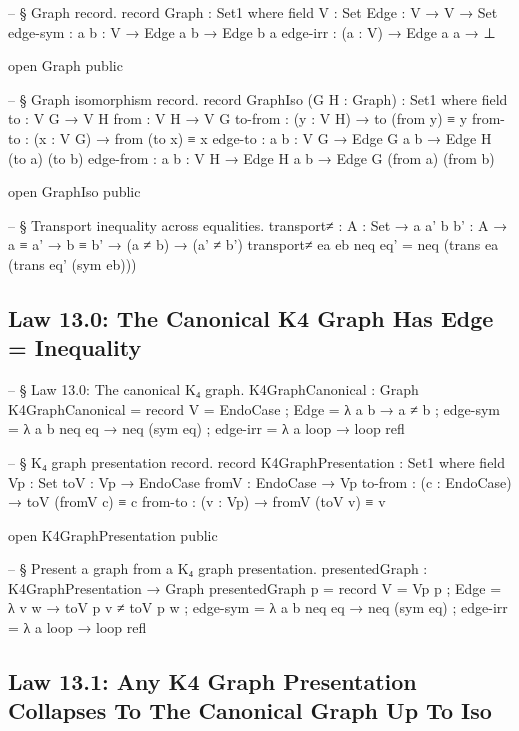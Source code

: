 \documentclass[11pt,a4paper]{book}
\def\texorpdfstring#1#2{#2}%
\begin{document}
\begin{code}
-- § Graph record.
record Graph : Set1 where
  field
    V    : Set
    Edge : V → V → Set
    edge-sym : {a b : V} → Edge a b → Edge b a
    edge-irr : (a : V) → Edge a a → ⊥

open Graph public

-- § Graph isomorphism record.
record GraphIso (G H : Graph) : Set1 where
  field
    to       : V G → V H
    from     : V H → V G
    to-from  : (y : V H) → to (from y) ≡ y
    from-to  : (x : V G) → from (to x) ≡ x
    edge-to  : {a b : V G} → Edge G a b → Edge H (to a) (to b)
    edge-from : {a b : V H} → Edge H a b → Edge G (from a) (from b)

open GraphIso public

-- § Transport inequality across equalities.
transport≠ :
  {A : Set} →
  {a a' b b' : A} →
  a ≡ a' →
  b ≡ b' →
  (a ≠ b) →
  (a' ≠ b')
transport≠ ea eb neq eq' = neq (trans ea (trans eq' (sym eb)))
\end{code}

\subsection{Law 13.0: The Canonical K\texorpdfstring{$_4$}{4} Graph Has Edge = Inequality}

\begin{code}
-- § Law 13.0: The canonical K₄ graph.
K4GraphCanonical : Graph
K4GraphCanonical = record
  { V = EndoCase
  ; Edge = λ a b → a ≠ b
  ; edge-sym = λ {a} {b} neq eq → neq (sym eq)
  ; edge-irr = λ a loop → loop refl
  }

-- § K₄ graph presentation record.
record K4GraphPresentation : Set1 where
  field
    Vp      : Set
    toV     : Vp → EndoCase
    fromV   : EndoCase → Vp
    to-from : (c : EndoCase) → toV (fromV c) ≡ c
    from-to : (v : Vp) → fromV (toV v) ≡ v

open K4GraphPresentation public

-- § Present a graph from a K₄ graph presentation.
presentedGraph : K4GraphPresentation → Graph
presentedGraph p = record
  { V = Vp p
  ; Edge = λ v w → toV p v ≠ toV p w
  ; edge-sym = λ {a} {b} neq eq → neq (sym eq)
  ; edge-irr = λ a loop → loop refl
  }
\end{code}

\subsection{Law 13.1: Any K\texorpdfstring{$_4$}{4} Graph Presentation Collapses To The Canonical Graph Up To Iso}
\end{document}
